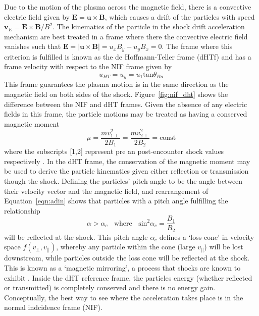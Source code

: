 Due to the motion of the plasma across the magnetic field, there is a convective electric field given by $\mathbf{E} = \mathbf{u}\times \mathbf{B}$, which causes a drift of the particles with speed $\mathbf{v}_E = \mathbf{E}\times \mathbf{B}/B^2$. The kinematics of the particle in the shock drift acceleration mechanism are best treated in a frame where there the convective electric field vanishes such that $\mathbf{E} = |\mathbf{u}\times \mathbf{B}|=u_x B_y - u_yB_x = 0$. The frame where this criterion is fulfilled is known as the de Hoffmann-Teller frame (dHTf) \citep{dehoffmann1950} and has a frame velocity with respect to the NIF frame given by
\begin{equation}
u_{HT} = u_y = u_1\mathrm{tan}\theta_{Bn}
\end{equation}
This frame guarantees the plasma motion is in the same direction as the magnetic field on both sides of the shock. Figure~\ref{fig:nif_dht} shows the difference between the NIF and dHT frames. Given the absence of any electric fields in this frame, the particle motions may be treated as having a conserved magnetic moment
\begin{equation}
\mu = \frac{mv^2_{1\perp}}{2B_1} = \frac{mv^2_{2\perp}}{2B_2} = \mathrm{const}
\label{eqn:adin}
\end{equation}
where the subscripts [1,2] represent pre an post-encounter shock values respectively \citep{ball2001}. In the dHT frame, the conservation of the magnetic moment may be used to derive the particle kinematics given either reflection or transmission though the shock. Defining the particles' pitch angle to be the angle between their velocity vector and the magnetic field, and rearrangement of Equation~\ref{eqn:adin} shows that particles with a pitch angle fulfilling the relationship
\begin{equation}
\alpha > \alpha_c~~~~\mathrm{where}~~~~\mathrm{sin}^2\alpha_c = \frac{B_1}{B_2}
\end{equation}
will be reflected at the shock. This pitch angle $\alpha_c$ defines a `loss-cone' in velocity space $f(v_{\perp}, v_{||})$, whereby any particle within the cone (large $v_{||}$) will be lost downstream, while particles outside the loss cone will be reflected at the shock. This is known as a `magnetic mirroring', a process that shocks are known to exhibit \citep{feldman1983}. Inside the dHT reference frame, the particles energy (whether reflected or transmitted) is completely conserved and there is no energy gain. Conceptually, the best way to see where the acceleration takes place is in the normal indcidence frame (NIF).
